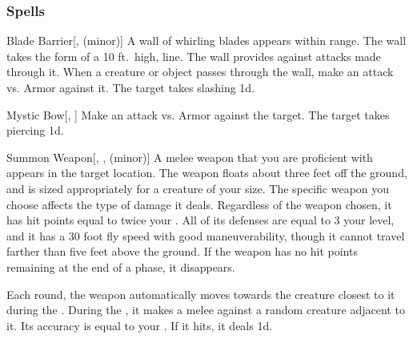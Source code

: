 \subsubsection{Spells}


\lowercase{\hypertarget{spell:Blade Barrier}{}}\label{spell:Blade Barrier}
\begin{freeability}[Rank 1]{\hypertarget{spell:Blade Barrier}{Blade Barrier}}[,  (minor)]
A wall of whirling blades appears within \rngmed range.
The wall takes the form of a 10 ft.\ high, \arealarge line.
The wall provides  against attacks made through it.
When a creature or object passes through the wall, make an attack vs. Armor against it.
\hit The target takes slashing  \minus1d.
\end{freeability}
\vspace{0.25em}



\lowercase{\hypertarget{spell:Mystic Bow}{}}\label{spell:Mystic Bow}
\begin{freeability}[Rank 1]{\hypertarget{spell:Mystic Bow}{Mystic Bow}}[, ]
Make an attack vs. Armor against the target.
\hit The target takes piercing  \plus1d.
\end{freeability}
\vspace{0.25em}



\lowercase{\hypertarget{spell:Summon Weapon}{}}\label{spell:Summon Weapon}
\begin{freeability}[Rank 1]{\hypertarget{spell:Summon Weapon}{Summon Weapon}}[, ,  (minor)]
A melee weapon that you are proficient with appears in the target location.
The weapon floats about three feet off the ground, and is sized appropriately for a creature of your size.
The specific weapon you choose affects the type of damage it deals.
Regardless of the weapon chosen, it has hit points equal to twice your .
All of its defenses are equal to 3 \add your level, and it has a 30 foot fly speed with good maneuverability, though it cannot travel farther than five feet above the ground.
If the weapon has no hit points remaining at the end of a phase, it disappears.

Each round, the weapon automatically moves towards the creature closest to it during the .
During the , it makes a melee  against a random creature adjacent to it.
Its accuracy is equal to your .
If it hits, it deals  \minus1d.
\end{freeability}
\vspace{0.25em}



